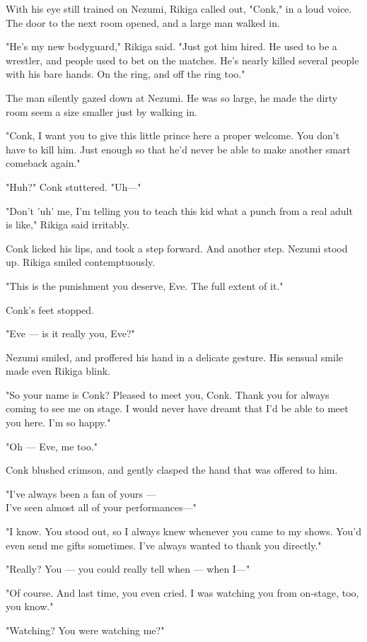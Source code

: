 With his eye still trained on Nezumi, Rikiga called out, "Conk," in a
loud voice. The door to the next room opened, and a large man walked in.

"He's my new bodyguard," Rikiga said. "Just got him hired. He used to be
a wrestler, and people used to bet on the matches. He's nearly killed
several people with his bare hands. On the ring, and off the ring too."

The man silently gazed down at Nezumi. He was so large, he made the
dirty room seem a size smaller just by walking in.

"Conk, I want you to give this little prince here a proper welcome. You
don't have to kill him. Just enough so that he'd never be able to make
another smart comeback again."

"Huh?" Conk stuttered. "Uh---"

"Don't 'uh' me, I'm telling you to teach this kid what a punch from a
real adult is like," Rikiga said irritably.

Conk licked his lips, and took a step forward. And another step. Nezumi
stood up. Rikiga smiled contemptuously.

"This is the punishment you deserve, Eve. The full extent of it."

Conk's feet stopped.

"Eve --- is it really you, Eve?"

Nezumi smiled, and proffered his hand in a delicate gesture. His sensual
smile made even Rikiga blink.

"So your name is Conk? Pleased to meet you, Conk. Thank you for always
coming to see me on stage. I would never have dreamt that I'd be able to
meet you here. I'm so happy."

"Oh --- Eve, me too."

Conk blushed crimson, and gently clasped the hand that was offered to
him.

"I've always been a fan of yours ---\\I've seen almost all of your
performances---"

"I know. You stood out, so I always knew whenever you came to my shows.
You'd even send me gifts sometimes. I've always wanted to thank you
directly."

"Really? You --- you could really tell when --- when I---"

"Of course. And last time, you even cried. I was watching you from
on-stage, too, you know."

"Watching? You were watching me?"


